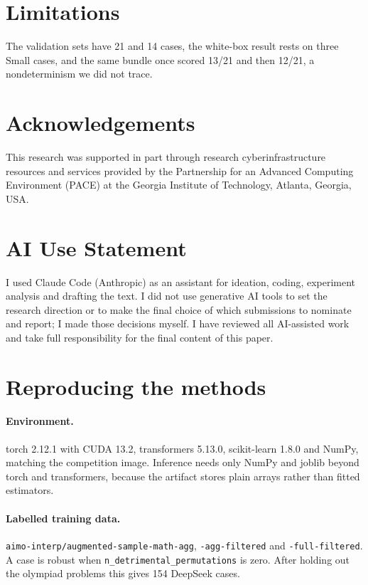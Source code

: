 \documentclass{article}
\begin{document}
\section{Limitations}\label{limitations}

The validation sets have 21 and 14 cases, the white-box result rests on three Small cases, and the same bundle once scored 13/21 and then 12/21, a nondeterminism we did not trace.

\section*{Acknowledgements}
This research was supported in part through research cyberinfrastructure resources and services provided by the Partnership for an Advanced Computing Environment (PACE) at the Georgia Institute of Technology, Atlanta, Georgia, USA.

\section*{AI Use Statement}
I used Claude Code (Anthropic) as an assistant for ideation, coding, experiment analysis and drafting the text. I did not use generative AI tools to set the research direction or to make the final choice of which submissions to nominate and report; I made those decisions myself. I have reviewed all AI-assisted work and take full responsibility for the final content of this paper.




\appendix
\section{Reproducing the methods}
\paragraph{Environment.} torch 2.12.1 with CUDA 13.2, transformers 5.13.0, scikit-learn 1.8.0 and NumPy, matching the competition image. Inference needs only NumPy and joblib beyond torch and transformers, because the artifact stores plain arrays rather than fitted estimators.

\paragraph{Labelled training data.} \texttt{aimo-interp/augmented-sample-math-agg}, \texttt{-agg-filtered} and \texttt{-full-filtered}. A case is robust when \texttt{n\_detrimental\_permutations} is zero. After holding out the olympiad problems this gives 154 DeepSeek cases.
\end{document}
